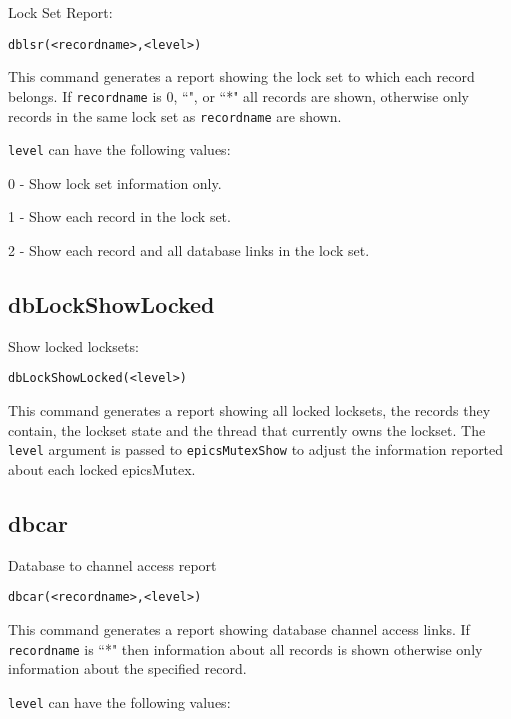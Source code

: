 Lock Set Report:

\begin{verbatim}dblsr(<recordname>,<level>)
\end{verbatim}This command generates a report showing the lock set to which each record belongs. If \verb|recordname| is 0, ``", or ``*" all 
records are shown, otherwise only records in the same lock set as \verb|recordname| are shown.

\verb|level| can have the following values:

\begin{description}\item 0 - Show lock set information only.

\item 1 - Show each record in the lock set.

\item 2 - Show each record and all database links in the lock set.

\end{description}\subsection{dbLockShowLocked}

Show locked locksets:

\begin{verbatim}dbLockShowLocked(<level>)
\end{verbatim}This command generates a report showing all locked locksets, the records they contain, the lockset state and the thread 
that currently owns the lockset. The \verb|level| argument is passed to \verb|epicsMutexShow| to adjust the information reported 
about each locked epicsMutex.

\subsection{dbcar}

Database to channel access report

\begin{verbatim}dbcar(<recordname>,<level>)
\end{verbatim}This command generates a report showing database channel access links. If \verb|recordname| is ``*" then information about 
all records is shown otherwise only information about the specified record.

\verb|level| can have the following values:

